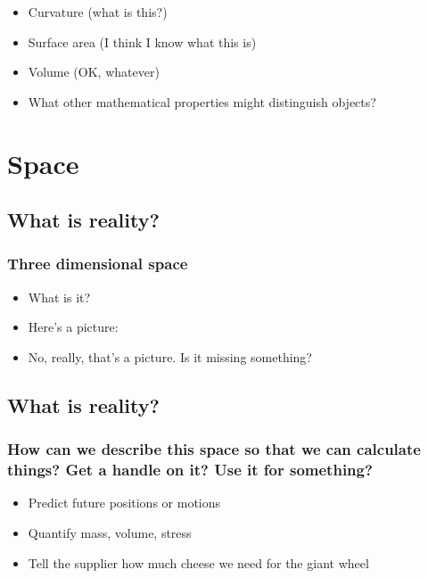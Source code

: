 \documentclass[]{article}
\begin{document}
\begin{itemize}
\itemsep1pt\parskip0pt
\item
  Curvature (what is this?)
\item
  Surface area (I think I know what this is)
\item
  Volume (OK, whatever)
\item
  What other mathematical properties might distinguish objects?
\end{itemize}

\section{Space}\label{space}

\subsection{What is reality?}\label{what-is-reality}

\subsubsection{Three dimensional space}\label{three-dimensional-space}

\begin{itemize}
\itemsep1pt\parskip0pt
\item
  What is it?
\item
  Here's a picture:
\item
  No, really, that's a picture. Is it missing something?
\end{itemize}

\subsection{What is reality?}\label{what-is-reality-1}

\subsubsection{How can we describe this space so that we can calculate
things? Get a handle on it? Use it for
something?}\label{how-can-we-describe-this-space-so-that-we-can-calculate-things-get-a-handle-on-it-use-it-for-something}

\begin{itemize}
\itemsep1pt\parskip0pt
\item
  Predict future positions or motions
\item
  Quantify mass, volume, stress
\item
  Tell the supplier how much cheese we need for the giant wheel
\end{itemize}
\end{document}

